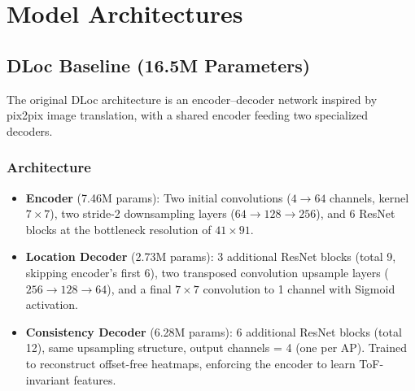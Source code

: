 \documentclass[11pt,a4paper]{article}
\begin{document}
\section{Model Architectures}

\subsection{DLoc Baseline (16.5M Parameters)}

The original DLoc architecture is an encoder--decoder network inspired by pix2pix image translation, with a shared encoder feeding two specialized decoders.

\subsubsection{Architecture}

\begin{itemize}[leftmargin=*]
    \item \textbf{Encoder} (7.46M params): Two initial convolutions ($4 \to 64$ channels, kernel $7\times7$), two stride-2 downsampling layers ($64 \to 128 \to 256$), and 6 ResNet blocks at the bottleneck resolution of $41\times91$.
    \item \textbf{Location Decoder} (2.73M params): 3 additional ResNet blocks (total 9, skipping encoder's first 6), two transposed convolution upsample layers ($256 \to 128 \to 64$), and a final $7\times7$ convolution to 1 channel with Sigmoid activation.
    \item \textbf{Consistency Decoder} (6.28M params): 6 additional ResNet blocks (total 12), same upsampling structure, output channels = 4 (one per AP). Trained to reconstruct offset-free heatmaps, enforcing the encoder to learn ToF-invariant features.
\end{itemize}
\end{document}
